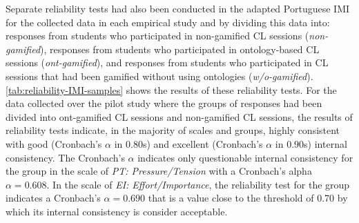 
Separate reliability tests had also been conducted in the adapted Portuguese IMI for the collected data in each empirical study and by dividing this data into: responses from students who participated in non-gamified CL sessions (\emph{non-gamified}), responses from students who participated in ontology-based CL sessions (\emph{ont-gamified}), and responses from students who participated in CL sessions that had been gamified without using ontologies (\emph{w/o-gamified}). \autoref{tab:reliability-IMI-samples} shows the results of these reliability tests. For the data collected over the pilot study where the groups of responses had been divided into ont-gamified CL sessions and non-gamified CL sessions, the results of reliability tests indicate, in the majority of scales and groups, highly consistent with good (Cronbach's $\alpha$ in $0.80$s) and excellent (Cronbach's $\alpha$ in $0.90$s) internal consistency. The Cronbach's $\alpha$ indicates only questionable internal consistency for the  group in the scale of \emph{PT: Pressure/Tension} with a Cronbach's alpha $\alpha = 0.608$. In the scale of \emph{EI: Effort/Importance}, the reliability test for the  group indicates a Cronbach's $\alpha = 0.690$ that is a value close to the threshold of 0.70 by which its internal consistency is consider acceptable. 

